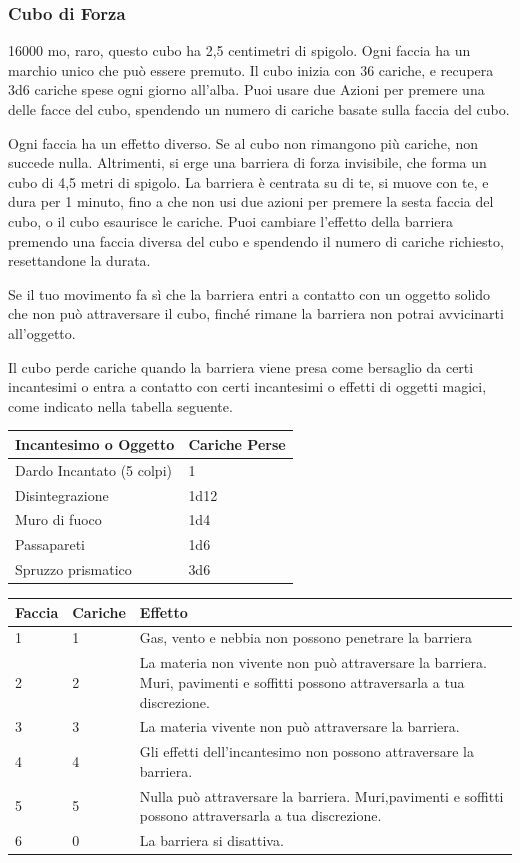 \begin{multicols}{2}
	\subsubsection*{Cubo di Forza}
	16000 mo, raro, questo cubo ha 2,5 centimetri di spigolo. Ogni faccia ha un marchio unico che può essere premuto. Il cubo inizia con 36 cariche, e recupera 3d6 cariche spese ogni giorno all'alba. Puoi usare due Azioni per premere una delle facce del cubo, spendendo un numero di cariche basate sulla faccia del cubo.

	Ogni faccia ha un effetto diverso. Se al cubo non rimangono più cariche, non succede nulla. Altrimenti, si erge una barriera di forza invisibile, che forma un cubo di 4,5 metri di spigolo. La barriera è centrata su di te, si muove con te, e dura per 1 minuto, fino a che non usi due azioni per premere la sesta faccia del cubo, o il cubo esaurisce le cariche. Puoi cambiare l'effetto della barriera premendo una faccia diversa del cubo e spendendo il numero di cariche richiesto, resettandone la durata.

	Se il tuo movimento fa sì che la barriera entri a contatto con un oggetto solido che non può attraversare il cubo, finché rimane la barriera non potrai avvicinarti all'oggetto.

	\medskip

	Il cubo perde cariche quando la barriera viene presa come bersaglio da certi incantesimi o entra a contatto con certi incantesimi o effetti di oggetti magici, come indicato nella tabella seguente.

	\medskip

	\begin{tabular}{ll}
		\textbf{Incantesimo o Oggetto} &\textbf{Cariche Perse}\\
		\hline
		Dardo Incantato (5 colpi) &1\\
		Disintegrazione &1d12\\
		Muro di fuoco &1d4\\
		Passapareti& 1d6\\
		Spruzzo prismatico &3d6\\
	\end{tabular}

	\medskip

	\begin{tabularx}{0.45\textwidth}{llX}
		\textbf{Faccia} & \textbf{Cariche}& \textbf{Effetto}\\
		\hline
		1& 1& Gas, vento e nebbia non possono penetrare la barriera\\
		2& 2 &La materia non vivente non può attraversare la barriera. Muri, pavimenti e soffitti possono attraversarla a tua discrezione.\\
		3 &3 &La materia vivente non può attraversare la barriera.\\
		4 &4 &Gli effetti dell'incantesimo non possono attraversare la barriera.\\
		5 &5 &Nulla può attraversare la barriera. Muri,pavimenti e soffitti possono attraversarla a tua discrezione.\\
		6 &0& La barriera si disattiva. \\
	\end{tabularx}



\end{multicols}
